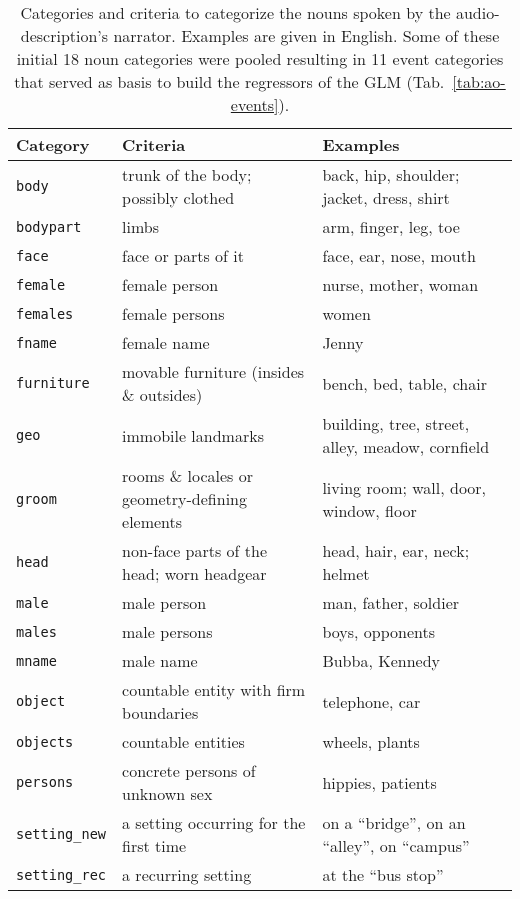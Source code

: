 \documentclass[english]{article}
\begin{document}
\begin{table*}[tbp]
    \caption{Categories and criteria to categorize the nouns spoken by
        the audio-description's narrator.
        Examples are given in English.
        Some of these initial 18 noun categories were pooled resulting in 11
        event categories that served as basis to build the regressors of the
        GLM
        (Tab.~\ref{tab:ao-events}).
}
\label{tab:descr-nouns-rules}
\begin{tabular}{lp{61mm}p{61mm}}
\toprule
\textbf{Category} & \textbf{Criteria} & \textbf{Examples} \\
\midrule
\texttt{body} & trunk of the body; possibly clothed & back, hip, shoulder; jacket, dress, shirt
\tabularnewline
\texttt{bodypart} & limbs & arm, finger, leg, toe
\tabularnewline
\texttt{face} & face or parts of it & face, ear, nose, mouth
\tabularnewline
\texttt{female} & female person & nurse, mother, woman
\tabularnewline
\texttt{females} & female persons & women
\tabularnewline
\texttt{fname} & female name & Jenny
\tabularnewline
\texttt{furniture} & movable furniture (insides \& outsides) & bench, bed, table, chair
\tabularnewline
\texttt{geo} & immobile landmarks & building, tree, street, alley, meadow, cornfield
\tabularnewline
\texttt{groom} & rooms \& locales or geometry-defining elements & living room; wall, door, window, floor
\tabularnewline
\texttt{head} & non-face parts of the head; worn headgear & head, hair, ear, neck;
helmet
\tabularnewline
\texttt{male} & male person & man, father, soldier
\tabularnewline
\texttt{males} & male persons & boys, opponents
\tabularnewline
\texttt{mname} & male name & Bubba, Kennedy
\tabularnewline
\texttt{object} & countable entity with firm boundaries & telephone, car
\tabularnewline
\texttt{objects} & countable entities & wheels, plants
\tabularnewline
\texttt{persons} & concrete persons of unknown sex & hippies, patients
\tabularnewline
\texttt{setting\_new} & a setting occurring for the first time & on a ``bridge'', on an ``alley'', on ``campus''
\tabularnewline
\texttt{setting\_rec} & a recurring setting & at the ``bus stop'' \tabularnewline
\bottomrule
\end{tabular}
\end{table*}
\end{document}
